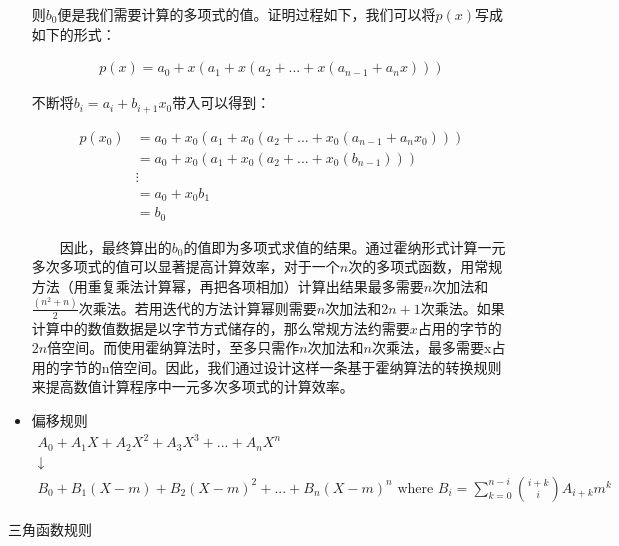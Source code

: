 \begin{itemize}
  则$b_0$便是我们需要计算的多项式的值。证明过程如下，我们可以将$p(x)$写成如下的形式：

  \begin{gather*}
    p(x) = a_0+x(a_1+x(a_2+...+x(a_{n-1}+a_nx))) 
  \end{gather*}

  不断将$b_i = a_i + b_{i+1}x_0$带入可以得到：

  \begin{equation*}
    \begin{split}
    p(x_0) & = a_0+x_0(a_1+x_0(a_2+...+x_0(a_{n-1}+a_nx_0))) \\
           & = a_0+x_0(a_1+x_0(a_2+...+x_0(b_{n-1}))) \\
           & \vdots \\
           & = a_0 + x_0b_1 \\
           & = b_0
    \end{split}
  \end{equation*}

  　　因此，最终算出的$b_0$的值即为多项式求值的结果。通过霍纳形式计算一元多次多项式的值可以显著提高计算效率，对于一个$n$次的多项式函数，用常规方法（用重复乘法计算幂，再把各项相加）计算出结果最多需要$n$次加法和$\frac{(n^{2}+n)}{2}$次乘法。若用迭代的方法计算幂则需要$n$次加法和$2n+1$次乘法。如果计算中的数值数据是以字节方式储存的，那么常规方法约需要$x$占用的字节的$2n$倍空间。而使用霍纳算法时，至多只需作$n$次加法和$n$次乘法，最多需要x占用的字节的n倍空间。因此，我们通过设计这样一条基于霍纳算法的转换规则来提高数值计算程序中一元多次多项式的计算效率。\\

  \item {\kaishu 偏移规则} 
  \begin{gather*}
  A_0 + A_1X + A_2X^2 + A_3X^3 + ... + A_nX^n \\
  \downarrow \\
  B_0 + B_1(X - m) + B_2(X - m)^2 + ... + B_n(X - m)^n \text{ where } B_i=\sum_{k=0}^{n-i} \binom{i+k}{i}A_{i+k}m^k
  \end{gather*}
\end{itemize}

\vspace{1mm}
\begin{center}
{\kaishu{} 三角函数规则}
\end{center}
\vspace{1mm}

